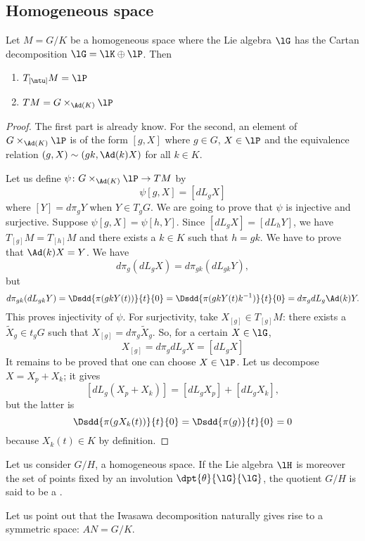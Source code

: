\subsection{Homogeneous space}


\begin{proposition}
Let $M=G/K$ be a homogeneous space where the Lie algebra $\lG$ has the Cartan decomposition $\lG=\lK\oplus\lP$. Then
\begin{enumerate}
\item $T_{[\mtu]}M=\lP$
\item $TM=G\times_{\Ad(K)}\lP$
\end{enumerate}

\end{proposition}

\begin{proof}
The first part is already know. For the second, an element of $G\times_{\Ad(K)}\lP$ is of the form $[g,X]$ where $g\in G$, $X\in\lP$ and the equivalence relation $(g,X)\sim(gk,\Ad(k)X)$ for all $k\in K$.

Let us define $\psi\colon G\times_{\Ad(K)}\lP\to TM$ by
\[
  \psi[g,X]=[dL_gX]
\]
where $[Y]=d\pi_gY$ when $Y\in T_gG$. We are going to prove that $\psi$ is injective and surjective. Suppose $\psi[g,X]=\psi[h,Y]$. Since $[dL_gX]=[dL_hY]$, we have $T_{[g]}M=T_{[h]}M$ and there exists a $k\in K$ such that $h=gk$. We have to prove that $\Ad(k)X=Y$. We have
\[
  d\pi_g(dL_gX)=d\pi_{gk}(dL_{gk}Y),
\]
but
\[
  d\pi_{gk}(dL_{gk}Y)=\Dsdd{ \pi(gkY(t)) }{t}{0}
		=\Dsdd{ \pi(gkY(t)k^{-1}) }{t}{0}
		=d\pi_gdL_g\Ad(k)Y.
\]
This proves injectivity of $\psi$. For surjectivity, take $X_{[g]}\in T_{[g]}M$: there exists a $\tilde X_g\in t_gG$ such that $X_{[g]}=d\pi_g\tilde X_g$. So, for a certain $X\in\lG$,
\[
  X_{[g]}=d\pi_gdL_gX
		=[dL_gX]
\]
It remains to be proved that one can choose $X\in\lP$. Let us decompose $X=X_p+X_k$; it gives
\[
  [dL_g(X_p+X_k)]=[dL_gX_p]+[dL_gX_k],
\]
but the latter is
\[
  \Dsdd{ \pi(gX_k(t)) }{t}{0}=\Dsdd{ \pi(g) }{t}{0}=0
\]
because $X_k(t)\in K$ by definition.
\end{proof}



Let us consider $G/H$, a homogeneous space. If the Lie algebra $\lH$ is moreover the set of points fixed by an involution $\dpt{\theta}{\lG}{\lG}$, the quotient $G/H$ is said to be a .

Let us point out that the Iwasawa decomposition naturally gives rise to a symmetric space: $AN=G/K$.

